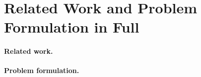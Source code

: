 \section{Related Work and Problem Formulation in Full}
\label{app:full}

\paragraph{Related work.}


\paragraph{Problem formulation.}
\begingroup\renewcommand{\eqfilterlab}{\tag{\ref{eq:filter}}}%

\endgroup
